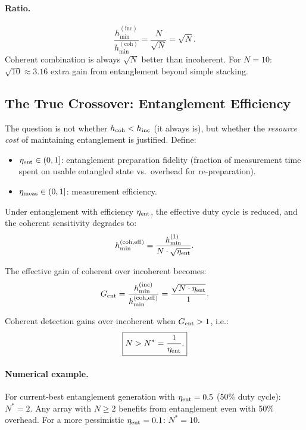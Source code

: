 \documentclass[11pt]{article}
\theoremstyle{definition}
\theoremstyle{remark}
\begin{document}
\paragraph{Ratio.}
\begin{equation}
\frac{h_{\min}^{(\mathrm{inc})}}{h_{\min}^{(\mathrm{coh})}} = \frac{N}{\sqrt{N}} = \sqrt{N}.
\end{equation}
Coherent combination is always $\sqrt{N}$ better than incoherent. For $N=10$:
$\sqrt{10} \approx 3.16$ extra gain from entanglement beyond simple stacking.

\subsection{The True Crossover: Entanglement Efficiency}

The question is not whether $h_{\rm coh} < h_{\rm inc}$ (it always is), but
whether the \emph{resource cost} of maintaining entanglement is justified.
Define:
\begin{itemize}
\item $\eta_{\rm ent} \in (0,1]$: entanglement preparation fidelity (fraction
  of measurement time spent on usable entangled state vs.\ overhead for
  re-preparation).
\item $\eta_{\rm meas} \in (0,1]$: measurement efficiency.
\end{itemize}

Under entanglement with efficiency $\eta_{\rm ent}$, the effective duty cycle
is reduced, and the coherent sensitivity degrades to:
\begin{equation}
h_{\min}^{(\mathrm{coh,eff})} = \frac{h_{\min}^{(1)}}{N \cdot \sqrt{\eta_{\rm ent}}}.
\label{eq:coh-eff}
\end{equation}

The effective gain of coherent over incoherent becomes:
\begin{equation}
G_{\rm ent} = \frac{h_{\min}^{(\mathrm{inc})}}{h_{\min}^{(\mathrm{coh,eff})}}
= \frac{\sqrt{N \cdot \eta_{\rm ent}}}{1}.
\end{equation}

Coherent detection gains over incoherent when $G_{\rm ent} > 1$, i.e.:
\begin{equation}
\boxed{N > N^* = \frac{1}{\eta_{\rm ent}}.}
\label{eq:crossover}
\end{equation}

\paragraph{Numerical example.}
For current-best entanglement generation with $\eta_{\rm ent} = 0.5$
(50\% duty cycle):
$N^* = 2$. Any array with $N \geq 2$ benefits from entanglement even with 50\%
overhead. For a more pessimistic $\eta_{\rm ent} = 0.1$: $N^* = 10$.
\end{document}
